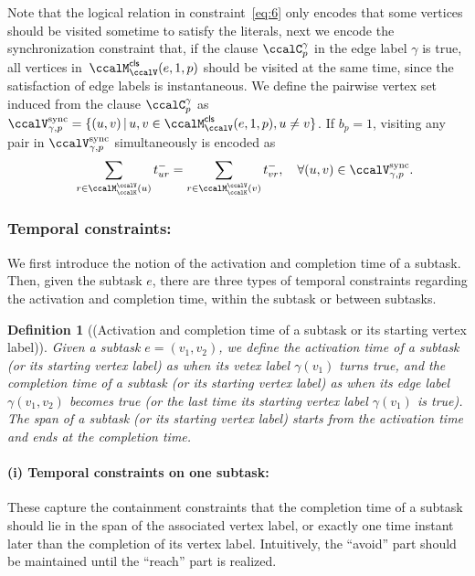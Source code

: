 \documentclass[Afour,sageh,times]{sagej}
\newtheorem{defn}[thm]{Definition}
\begin{document}
{{{    Note that the logical relation in constraint~\eqref{eq:6} only encodes that some vertices should be visited sometime to satisfy the literals, next we encode the synchronization constraint that, if the clause $\ccalC_p^\gamma$ in the edge label $\gamma$ is true, all vertices in~$\ccalM^\mathsf{cls}_\ccalV(e, 1,p)$ should be visited at the same time, since the satisfaction of edge labels is instantaneous.
      We define the pairwise vertex set induced from the clause $\ccalC_p^\gamma$ as  $\ccalV_{\gamma, p}^{\text{sync}} = \{(u,v)\,|\, u, v\in \ccalM^\mathsf{cls}_\ccalV(e,1,p), u\not= v \}$. If $b_p=1$, visiting any pair in $\ccalV_{\gamma, p}^{\text{sync}}$ simultaneously is encoded as
\begingroup\makeatletter\def\f@size{10}\check@mathfonts
\def\maketag@@@#1{\hbox{\m@th\normalsize\normalfont#1}}%
\begin{align}
  & \quad\quad  \sum_{r\in \ccalM^\ccalV_{\ccalK}(u)} t_{ur}^-  = \sum_{r\in \ccalM^\ccalV_{\ccalK}(v)} t_{vr}^- , \quad\forall (u,v) \in \ccalV_{\gamma, p}^{\text{sync}}.\label{eq:7}
\end{align}
\endgroup





\subsubsection{Temporal constraints:} We first introduce the notion of the activation and completion time of a subtask. Then, given the subtask $e$, there are three types of temporal constraints regarding the activation and completion time,  within the subtask or between subtasks.
\begin{defn}[(Activation and completion time of a subtask or its starting vertex label)]
Given a subtask $e = (v_1, v_2)$, we define the  activation time of a subtask (or its starting  vertex label) as when its vetex label $\gamma(v_1)$ turns true, and the completion time  of a subtask (or its starting vertex label) as when its edge label $\gamma(v_1, v_2)$ becomes true (or the last time its starting vertex label $\gamma(v_1)$ is true). The span of a subtask (or its starting vertex label) starts from the activation time and ends at the completion time.
\end{defn}
\paragraph{(i) Temporal constraints on one subtask:}\label{sec:onesubtask} These capture the containment constraints that the completion time of a subtask should lie in the span of the associated vertex label, or exactly one time instant later than the completion of its vertex label. Intuitively, the ``avoid'' part should be maintained until the ``reach'' part is realized.

}}}
\end{document}

